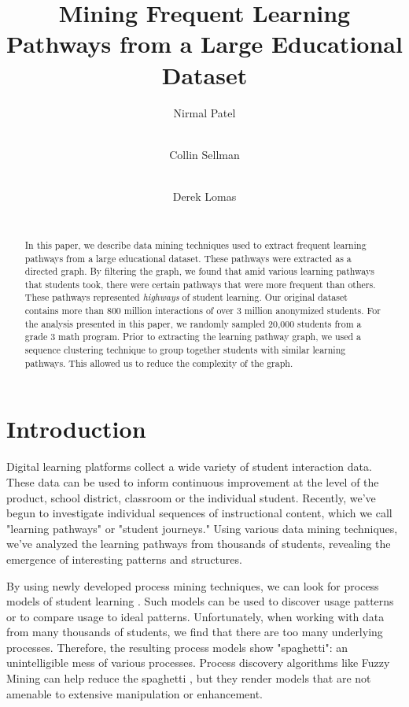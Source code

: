 \documentclass{edm_template}
\begin{document}
\title{Mining Frequent Learning Pathways from a Large Educational Dataset}

%
\author{
Nirmal Patel \\  \\  \and
Collin Sellman \\  \\  \and
Derek Lomas \\  \\ 
}

\maketitle
\begin{abstract}
In this paper, we describe data mining techniques used to extract frequent learning pathways from a large educational dataset. These pathways were extracted as a directed graph. By filtering the graph, we found that amid various learning pathways that students took, there were certain pathways that were more frequent than others. These pathways represented \textit{highways} of student learning. Our original dataset contains more than 800 million interactions of over 3 million anonymized students. For the analysis presented in this paper, we randomly sampled 20,000 students from a grade 3 math program. Prior to extracting the learning pathway graph, we used a sequence clustering technique to group together students with similar learning pathways. This allowed us to reduce the complexity of the graph.
\end{abstract}

\section{Introduction}
Digital learning platforms collect a wide variety of student interaction data. These data can be used to inform continuous improvement at the level of the product, school district, classroom or the individual student. Recently, we've begun to investigate individual sequences of instructional content, which we call "learning pathways" or "student journeys."  Using  various data mining techniques, we've analyzed the learning pathways from thousands of students, revealing the emergence of interesting patterns and structures.

By using newly developed process mining techniques, we can look for process models of student learning \cite{mukala2015exploring, trcka2010process}. Such models can be used to discover usage patterns or to compare usage to ideal patterns. Unfortunately, when working with data from many thousands of students, we find that there are too many underlying processes. Therefore, the resulting process models show "spaghetti": an unintelligible mess of various processes. Process discovery algorithms like Fuzzy Mining can help reduce the spaghetti \cite{gunther2007fuzzy}, but they render models that are not amenable to extensive manipulation or enhancement.
\end{document}
